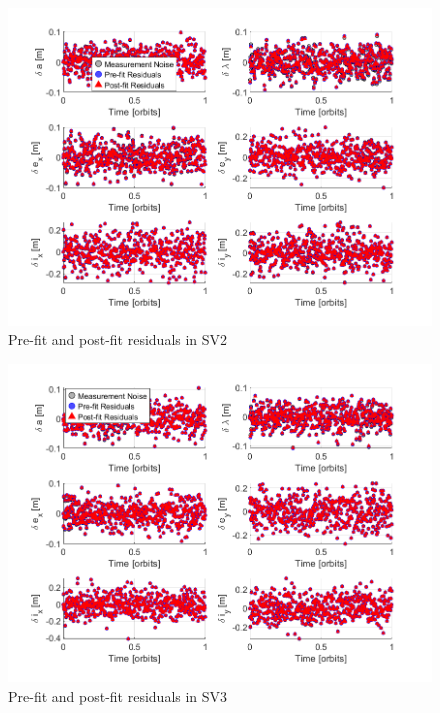 \begin{figure}[H]
    \centering
    \includegraphics[width=0.7\linewidth]{sim/figures/PS8/residuals_SV2.png}
    \caption{Pre-fit and post-fit residuals in SV2}
    \label{fig:sv2_residuals}
\end{figure}

\begin{figure}[H]
    \centering
    \includegraphics[width=0.7\linewidth]{sim/figures/PS8/residuals_SV3.png}
    \caption{Pre-fit and post-fit residuals in SV3}
    \label{fig:sv3_residuals}
\end{figure}
